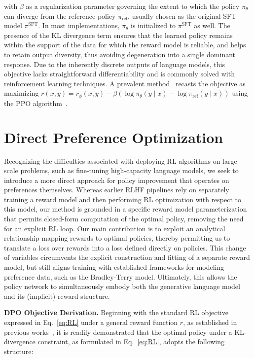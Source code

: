 with $\beta$ as a regularization parameter governing the extent to which the policy $\pi_\theta$ can diverge from the reference policy $\pi_\text{ref}$, usually chosen as the original SFT model $\pi^\text{SFT}$. In most implementations, $\pi_\theta$ is initialized to $\pi^\text{SFT}$ as well. The presence of the KL divergence term ensures that the learned policy remains within the support of the data for which the reward model is reliable, and helps to retain output diversity, thus avoiding degeneration into a single dominant response. Due to the inherently discrete outputs of language models, this objective lacks straightforward differentiability and is commonly solved with reinforcement learning techniques. A prevalent method~\citep{ziegler2020finetuning, stiennon2022learning, bai2022training, ouyang2022training} recasts the objective as maximizing ${r(x, y) = r_{\phi}(x, y) -\beta (\log \pi_{\theta}(y\mid x) - \log \pi_\text{ref}(y\mid x))}$ using the PPO algorithm~\cite{schulman2017proximal}.

\section{Direct Preference Optimization}\label{sec:DPO}

Recognizing the difficulties associated with deploying RL algorithms on large-scale problems, such as fine-tuning high-capacity language models, we seek to introduce a more direct approach for policy improvement that operates on preferences themselves. Whereas earlier RLHF pipelines rely on separately training a reward model and then performing RL optimization with respect to this model, our method is grounded in a specific reward model parameterization that permits closed-form computation of the optimal policy, removing the need for an explicit RL loop. Our main contribution is to exploit an analytical relationship mapping rewards to optimal policies, thereby permitting us to translate a loss over rewards into a loss defined directly on policies. This change of variables circumvents the explicit construction and fitting of a separate reward model, but still aligns training with established frameworks for modeling preference data, such as the Bradley-Terry model. Ultimately, this allows the policy network to simultaneously embody both the generative language model and its (implicit) reward structure.

\textbf{DPO Objective Derivation.} Beginning with the standard RL objective expressed in Eq.~\ref{eq:RL} under a general reward function $r$, as established in previous works~\citep{peters2007reinforcement, peng2019advantage, korbak2022reinforcement, go2023aligning}, it is readily demonstrated that the optimal policy under a KL-divergence constraint, as formulated in Eq.~\ref{eq:RL}, adopts the following structure:

